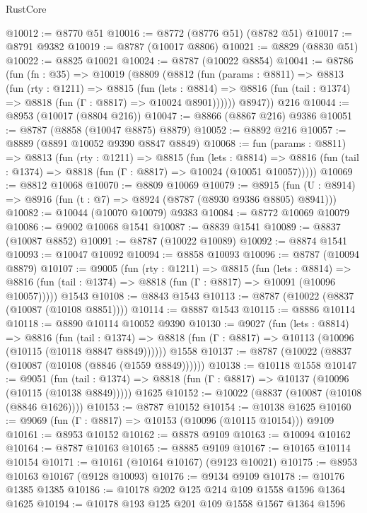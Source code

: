 \begin{lexlean}{RustCore}
\begin{coremodule}
@10012 := @8770 @51
@10016 := @8772 (@8776 @51) (@8782 @51)
@10017 := @8791 @9382
@10019 := @8787 (@10017 @8806)
@10021 := @8829 (@8830 @51)
@10022 := @8825 @10021
@10024 := @8787 (@10022 @8854)
@10041 := @8786
    (fun (fn : @35) =>
    @10019
      (@8809
        (@8812
          (fun (params : @8811) =>
          @8813
            (fun (rty : @1211) =>
            @8815
              (fun (lets : @8814) =>
              @8816 (fun (tail : @1374) => @8818 (fun (Γ : @8817) => @10024 @8901))))))
        @8947))
    @216
@10044 := @8953 (@10017 (@8804 @216))
@10047 := @8866 (@8867 @216) @9386
@10051 := @8787 (@8858 (@10047 @8875) @8879)
@10052 := @8892 @216
@10057 := @8889 (@8891 @10052 @9390 @8847 @8849)
@10068 := fun (params : @8811) =>
  @8813
    (fun (rty : @1211) =>
    @8815
      (fun (lets : @8814) =>
      @8816 (fun (tail : @1374) => @8818 (fun (Γ : @8817) => @10024 (@10051 @10057)))))
@10069 := @8812 @10068
@10070 := @8809 @10069
@10079 := @8915 (fun (U : @8914) => @8916 (fun (t : @7) => @8924 (@8787 (@8930 @9386 @8805) @8941)))
@10082 := @10044 (@10070 @10079) @9383
@10084 := @8772 @10069 @10079
@10086 := @9002 @10068 @1541
@10087 := @8839 @1541
@10089 := @8837 (@10087 @8852)
@10091 := @8787 (@10022 @10089)
@10092 := @8874 @1541
@10093 := @10047 @10092
@10094 := @8858 @10093
@10096 := @8787 (@10094 @8879)
@10107 := @9005
    (fun (rty : @1211) =>
    @8815
      (fun (lets : @8814) =>
      @8816 (fun (tail : @1374) => @8818 (fun (Γ : @8817) => @10091 (@10096 @10057)))))
    @1543
@10108 := @8843 @1543
@10113 := @8787 (@10022 (@8837 (@10087 (@10108 @8851))))
@10114 := @8887 @1543
@10115 := @8886 @10114
@10118 := @8890 @10114 @10052 @9390
@10130 := @9027
    (fun (lets : @8814) =>
    @8816
      (fun (tail : @1374) =>
      @8818 (fun (Γ : @8817) => @10113 (@10096 (@10115 (@10118 @8847 @8849))))))
    @1558
@10137 := @8787 (@10022 (@8837 (@10087 (@10108 (@8846 (@1559 @8849))))))
@10138 := @10118 @1558
@10147 := @9051
    (fun (tail : @1374) => @8818 (fun (Γ : @8817) => @10137 (@10096 (@10115 (@10138 @8849)))))
    @1625
@10152 := @10022 (@8837 (@10087 (@10108 (@8846 @1626))))
@10153 := @8787 @10152
@10154 := @10138 @1625
@10160 := @9069 (fun (Γ : @8817) => @10153 (@10096 (@10115 @10154))) @9109
@10161 := @8953 @10152
@10162 := @8878 @9109
@10163 := @10094 @10162
@10164 := @8787 @10163
@10165 := @8885 @9109
@10167 := @10165 @10114 @10154
@10171 := @10161 (@10164 @10167) (@9123 @10021)
@10175 := @8953 @10163 @10167 (@9128 @10093)
@10176 := @9134 @9109
@10178 := @10176 @1385 @1385
@10186 := @10178 @202 @125 @214 @109 @1558 @1596 @1364 @1625
@10194 := @10178 @193 @125 @201 @109 @1558 @1567 @1364 @1596

\end{coremodule}
\end{lexlean}
